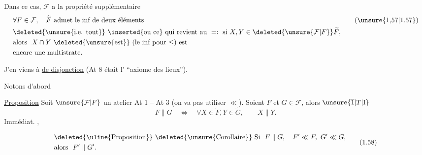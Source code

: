 Dans ce cas, $\mathcal F$ a la propriété
supplémentaire 
\begingroup\makeatletter\tagsleft@true\makeatother
\[
\begin{aligned}[t]
&\forall F\in\mathcal F,\quad \widetilde F\ \text{admet le inf de deux éléments}\\
&\text{\deleted{\unsure{i.e. tout}} \inserted{ou ce} qui revient au } = :\ \text{si } X,Y\in\deleted{\unsure{\mathcal F|F}}\widetilde F,\\
&\text{alors }\ X\cap Y\ \deleted{\unsure{\text{est}}}\ (\text{le inf pour }{\leq})\ \text{est}\\
&\text{encore une multistrate.}
\end{aligned}
\tag*{(\unsure{1,57|1.57})}
\]
\endgroup

J'en viens à  \uline{ de disjonction}
(At 8 était l' ``axiome des lieux'').

Notons d'abord

 

\uline{Proposition} Soit $\unsure{\mathcal F|F}$ un atelier
At 1 -- At 3 (on  va pas utiliser $\ll$).
Soient $F$ et $G\in\mathcal F$, alors $\unsure{\overline{1}|T|\mathrm{I}}$
\[
F\parallel G\quad\Longleftrightarrow\quad\forall X\in\widetilde F,Y\in\widetilde G,\qquad X\parallel Y.
\]
Immédiat. ,  

\begingroup\makeatletter\tagsleft@true\makeatother
\[
\begin{aligned}
&\text{\deleted{\uline{Proposition}} \deleted{\unsure{Corollaire}} Si }\ F\parallel G,\quad F'\ll F,\ G'\ll G,\\
&\text{alors }\ F'\parallel G'.
\end{aligned}
\tag*{(1.58)}
\]
\endgroup

